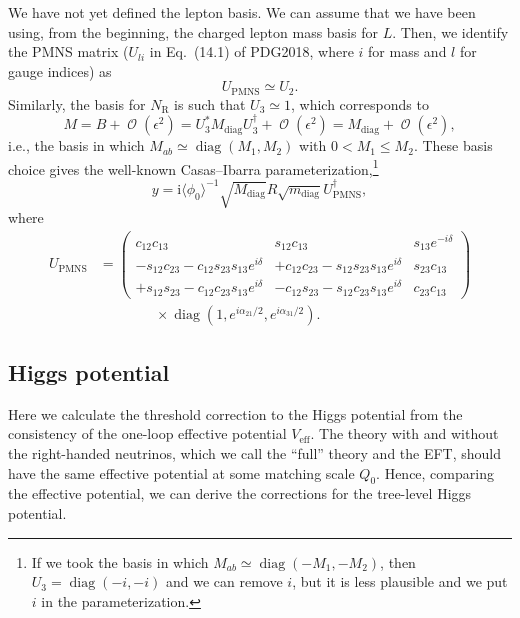 \documentclass[a4paper,11pt]{scrartcl}
\numberwithin{equation}{section}
\newcommand\w[1]{_{\mathrm{#1}}}
\newcommand\ii{\mathrm{i}}
\newcommand\pmat[1]{\begin{pmatrix}#1\end{pmatrix}}
\DeclareMathOperator{\Order}{\mathcal{O}}
\newcommand\vev[1]{\langle#1\rangle}
\newcommand\NR{{N\w R}}
\DeclareMathOperator{\diag}{\mathrm{diag}}
\begin{document}
We have not yet defined the lepton basis.
We can assume that we have been using, from the beginning, the charged lepton mass basis for $L$.
Then, we identify the PMNS matrix ($U_{li}$ in Eq.~(14.1) of PDG2018, where $i$ for mass and $l$ for gauge indices) as
\begin{equation}
 U\w{PMNS} \simeq U_2.
\end{equation}
Similarly, the basis for $\NR$ is such that $U_3 \simeq 1$, which corresponds to
\begin{equation}
 M = B + \Order(\epsilon^2) = U_3^* M\w{diag} U_3^\dagger +\Order(\epsilon^2) = M\w{diag} + \Order(\epsilon^2),
\end{equation}
i.e., the basis in which $M_{ab}\simeq\diag(M_1, M_2)$ with $0<M_1\le M_2$.
These basis choice gives the well-known Casas--Ibarra parameterization,\footnote{
If we took the basis in which $M_{ab}\simeq\diag(-M_1, -M_2)$, then $U_3=\diag(-i, -i)$ and we can remove $i$, but it is less plausible and we put $i$ in the parameterization.
}
\begin{equation}
 y = \ii\vev{\phi_0}^{-1}\sqrt{M\w{diag}}R\sqrt{m\w{diag}}U\w{PMNS}^\dagger,
\end{equation}
where
\begin{equation}\begin{split}
 U\w{PMNS} &= \pmat{
                 c_{12}      c_{13}             &                 s_{12}      c_{13}            &       s_{13} e^{-i\delta} \\
 -s_{12}c_{23} - c_{12}s_{23}s_{13}e^{i\delta}  & +c_{12}c_{23} - s_{12}s_{23}s_{13}e^{i\delta} & s_{23}c_{13}\\
 +s_{12}s_{23} - c_{12}c_{23}s_{13}e^{i\delta}  & -c_{12}s_{23} - s_{12}c_{23}s_{13}e^{i\delta} & c_{23}c_{13}
}
\\&\qquad\qquad
\times\diag(1, e^{i\alpha_{21}/2}, e^{i\alpha_{31}/2}).
\end{split}\end{equation}

\subsection{Higgs potential}
Here we calculate the threshold correction to the Higgs potential from the consistency of the one-loop effective potential $V\w{eff}$.
The theory with and without the right-handed neutrinos, which we call the ``full'' theory and the EFT, should have the same effective potential at some matching scale $Q_0$.
Hence, comparing the effective potential, we can derive the corrections for the tree-level Higgs potential.
\end{document}
